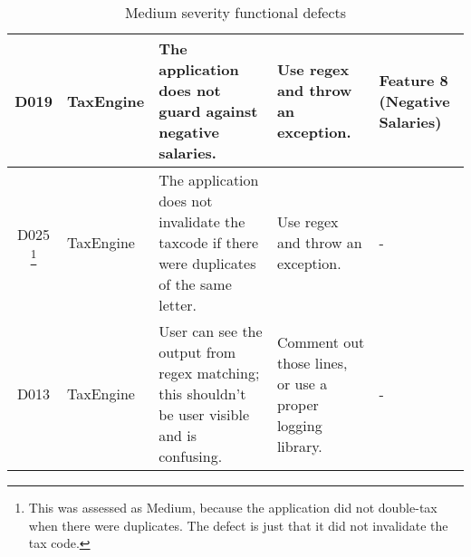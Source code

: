 \begin{table}[H]
\begin{minipage}{\textwidth}
\begin{tabularx}{\textwidth}{| c | P | X | X | P |}
D019 
& TaxEngine 
& The application does not guard against negative salaries. 
& Use regex and throw an exception.
& Feature 8 (Negative Salaries)\\
\hline %
D025 \footnote{This was assessed as Medium, because the application did not double-tax when there were duplicates. The defect is just that it did not invalidate the tax code.}
& TaxEngine 
& The application does not invalidate the taxcode if there were duplicates of the same letter. 
& Use regex and throw an exception.
& -\\
\hline %
D013 
& TaxEngine 
& User can see the output from regex matching; this shouldn't be user visible and is confusing.
& Comment out those lines, or use a proper logging library. 
& -\\
\hline %
\end{tabularx}
\caption{Medium severity functional defects}
\end{minipage}
\end{table}